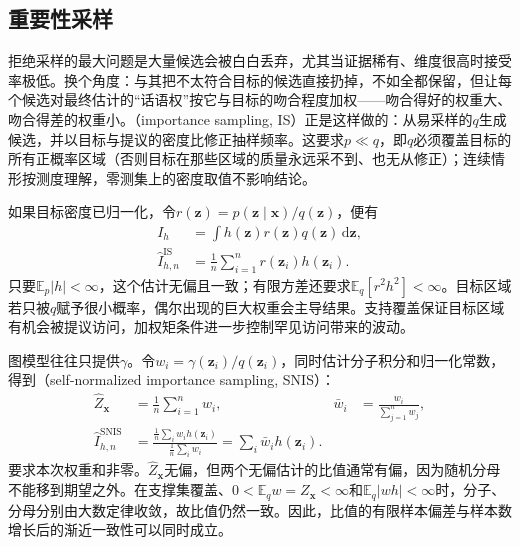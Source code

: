 \subsection{重要性采样}
\label{sec:pgm-sampling-importance}

拒绝采样的最大问题是大量候选会被白白丢弃，尤其当证据稀有、维度很高时接受率极低。换个角度：与其把不太符合目标的候选直接扔掉，不如全都保留，但让每个候选对最终估计的“话语权”按它与目标的吻合程度加权——吻合得好的权重大、吻合得差的权重小。（importance sampling, IS）正是这样做的：从易采样的$q$生成候选，并以目标与提议的密度比修正抽样频率。这要求$p\ll q$，即$q$必须覆盖目标的所有正概率区域（否则目标在那些区域的质量永远采不到、也无从修正）；连续情形按测度理解，零测集上的密度取值不影响结论。

如果目标密度已归一化，令$r(\bm{z})=p(\bm{z}\mid\bm{x})/q(\bm{z})$，便有
\begin{equation}
  \begin{aligned}
    I_h&=\int h(\bm{z})r(\bm{z})q(\bm{z})\,\mathrm{d}\bm{z},\\
    \widehat I_{h,n}^{\mathrm{IS}}
      &=\frac{1}{n}\sum_{i=1}^{n}r(\bm{z}_i)h(\bm{z}_i).
  \end{aligned}
  \label{eq:pgm-sampling-is}
\end{equation}
只要$\mathbb{E}_p|h|<\infty$，这个估计无偏且一致；有限方差还要求$\mathbb{E}_q[r^2h^2]<\infty$。目标区域若只被$q$赋予很小概率，偶尔出现的巨大权重会主导结果。支持覆盖保证目标区域有机会被提议访问，加权矩条件进一步控制罕见访问带来的波动。

图模型往往只提供$\gamma$。令$w_i=\gamma(\bm{z}_i)/q(\bm{z}_i)$，同时估计分子积分和归一化常数，得到（self-normalized importance sampling, SNIS）：
\begin{equation}
  \begin{aligned}
    \widehat Z_{\bm{x}}&=\frac{1}{n}\sum_{i=1}^{n}w_i,&
    \bar w_i&=\frac{w_i}{\sum_{j=1}^{n}w_j},\\
    \widehat I_{h,n}^{\mathrm{SNIS}}
      &=\frac{\frac{1}{n}\sum_i w_i h(\bm{z}_i)}
              {\frac{1}{n}\sum_i w_i}
       =\sum_i\bar w_i h(\bm{z}_i).
  \end{aligned}
  \label{eq:pgm-sampling-snis}
\end{equation}
要求本次权重和非零。$\widehat Z_{\bm{x}}$无偏，但两个无偏估计的比值通常有偏，因为随机分母不能移到期望之外。在支撑集覆盖、$0<\mathbb{E}_q w=Z_{\bm{x}}<\infty$和$\mathbb{E}_q|wh|<\infty$时，分子、分母分别由大数定律收敛，故比值仍然一致。因此，比值的有限样本偏差与样本数增长后的渐近一致性可以同时成立。

